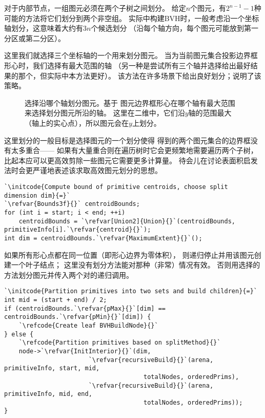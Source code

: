对于内部节点，一组图元必须在两个子树之间划分。
给定$n$个图元，有$2^{n-1}-1$种
可能的方法将它们划分到两个非空组。
实际中构建BVH时，一般考虑沿一个坐标轴划分，这意味着大约有$3n$个候选划分
（沿每个轴方向，每个图元可能放到第一分区或第二分区）。

这里我们就选择三个坐标轴的一个用来划分图元。
当为当前图元集合投影边界框形心时，我们选择有最大范围的轴
（另一种是尝试所有三个轴并选择给出最好结果的那个，但实际中本方法更好）。
该方法在许多场景下给出良好划分；说明了该策略。
\begin{figure}[htbp]
    \centering
    \caption{选择沿哪个轴划分图元。\protect{}基于
        图元边界框形心在哪个轴有最大范围来选择划分图元所沿的轴。
        这里在二维中，它们沿$y$轴的范围最大（轴上的实心点），所以图元会在$y$上划分。}
    \label{fig:4.3}
\end{figure}

这里划分的一般目标是选择图元的一个划分使得
得到的两个图元集合的边界框没有太多重合——
如果有大量重合则在遍历树时它会更频繁地需要遍历两个子树，
比起本应可以更高效剪除一些图元它需要更多计算量。
待会儿在讨论表面积启发法时会更严谨地表述该求取高效图元划分的思想。
\begin{lstlisting}
`\initcode{Compute bound of primitive centroids, choose split dimension dim}{=}`
`\refvar{Bounds3f}{}` centroidBounds;
for (int i = start; i < end; ++i)
    centroidBounds = `\refvar[Union2]{Union}{}`(centroidBounds, primitiveInfo[i].`\refvar{centroid}{}`);
int dim = centroidBounds.`\refvar{MaximumExtent}{}`();
\end{lstlisting}

如果所有形心点都在同一位置（即形心边界为零体积），
则递归停止并用该图元创建一个叶子结点；
这里没有划分方法能对那种（非常）情况有效。
否则用选择的方法划分图元并传入两个对的递归调用。
\begin{lstlisting}
`\initcode{Partition primitives into two sets and build children}{=}`
int mid = (start + end) / 2;
if (centroidBounds.`\refvar{pMax}{}`[dim] == centroidBounds.`\refvar{pMin}{}`[dim]) {
    `\refcode{Create leaf BVHBuildNode}{}`
} else {
    `\refcode{Partition primitives based on splitMethod}{}`
    node->`\refvar{InitInterior}{}`(dim,
                       `\refvar{recursiveBuild}{}`(arena, primitiveInfo, start, mid,
                                      totalNodes, orderedPrims),
                       `\refvar{recursiveBuild}{}`(arena, primitiveInfo, mid, end,
                                      totalNodes, orderedPrims));
}
\end{lstlisting}

